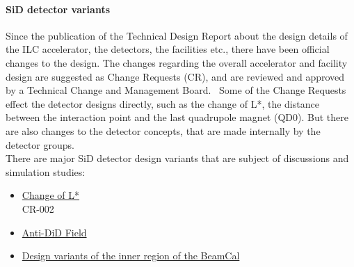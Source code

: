 \paragraph{SiD detector variants}
Since the publication of the Technical Design Report about the design details of the ILC accelerator, the detectors, the facilities etc., there have been official changes to the design.
The changes regarding the overall accelerator and facility design are suggested as Change Requests (CR), and are reviewed and approved by a Technical Change and Management Board.~\cite{TCMB} 
Some of the Change Requests effect the detector designs directly, such as the change of L*, the distance between the interaction point and the last quadrupole magnet (QD0).
But there are also changes to the detector concepts, that are made internally by the detector groups.\\
There are major SiD detector design variants that are subject of discussions and simulation studies:
\begin{itemize}
 \item \underline{Change of L*}\\
 CR-002~\cite{CR-002}
 \item \underline{Anti-DiD Field}\\
 \item \underline{Design variants of the inner region of the BeamCal}\\
\end{itemize}



\newpage
